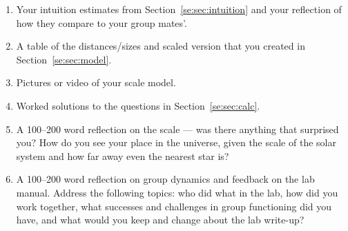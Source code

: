 \begin{enumerate}
	\item Your intuition estimates from Section~\ref{se:sec:intuition} and your reflection of how they compare to your group mates'.
	\item A table of the distances/sizes and scaled version that you created in Section~\ref{se:sec:model}.
	\item Pictures or video of your scale model.
	\item Worked solutions to the questions in Section~\ref{se:sec:calc}.
	\item A 100--200 word reflection on the scale --- was there anything that surprised you? How do you see your place in the universe, given the scale of the solar system and how far away even the nearest star is?
	\item A 100--200 word reflection on group dynamics and feedback on the lab manual. Address the following topics: who did what in the lab, how did you work together, what successes and challenges in group functioning did you have, and what would you keep and change about the lab write-up?
\end{enumerate}
